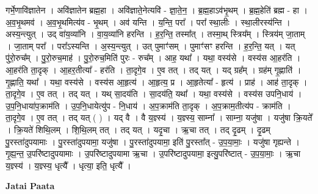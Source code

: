 \documentclass[17pt]{extarticle}
\begin{document}
गर्भे॒णावि॑ज्ञातेन । अवि॑ज्ञातेन ब्रह्म॒हा । अवि॑ज्ञाते॒नेत्यवि॑ - ज्ञा॒ते॒न॒ । ब्र॒ह्म॒हाऽव॑भृ॒थम् । ब्र॒ह्म॒हेति॑ ब्रह्म - हा । अ॒व॒भृ॒थमव॑ । अ॒व॒भृ॒थमित्य॑व - भृ॒थम् । अव॑ यन्ति । य॒न्ति॒ परा᳚ । परा᳚ स्था॒लीः । स्था॒लीरस्य॑न्ति । अस्य॒न्त्युत् । उद् वा॑य॒व्या॑नि । वा॒य॒व्या॑नि हरन्ति । ह॒र॒न्ति॒ तस्मा᳚त् । तस्मा॒थ् स्त्रिय᳚म् । स्त्रिय॑म् जा॒ताम् । जा॒ताम् परा᳚ । परा᳚ऽस्यन्ति । अ॒स्य॒न्त्युत् । उत् पुमाꣳ॑सम् । पुमाꣳ॑सꣳ हरन्ति । ह॒र॒न्ति॒ यत् । यत् पु॑रो॒रुच᳚म् । पु॒रो॒रुच॒माह॑ । पु॒रो॒रुच॒मिति॑ पुरः - रुच᳚म् । आह॒ यथा᳚ । यथा॒ वस्य॑से । वस्य॑स आ॒हर॑ति । आ॒हर॑ति ता॒दृक् । आ॒हर॒तीत्या᳚ - हर॑ति । ता॒दृगे॒व । ए॒व तत् । तद् यत् । यद् ग्रह᳚म् । ग्रह॑म् गृ॒ह्णाति॑ । गृ॒ह्णाति॒ यथा᳚ । यथा॒ वस्य॑से । वस्य॑स आ॒हृत्य॑ । आ॒हृत्य॒ प्र । आ॒हृतेत्या᳚ - हृत्य॑ । प्राह॑ । आह॑ ता॒दृक् । ता॒दृगे॒व । ए॒व तत् । तद् यत् । यथ् सा॒दय॑ति । सा॒दय॑ति॒ यथा᳚ । यथा॒ वस्य॑से । वस्य॑स उपनि॒धाय॑ । उ॒प॒नि॒धाया॑प॒क्राम॑ति । उ॒प॒नि॒धायेत्यु॑प - नि॒धाय॑ । अ॒प॒क्राम॑ति ता॒दृक् । अ॒प॒क्राम॒तीत्य॑प - क्राम॑ति । ता॒दृगे॒व । ए॒व तत् । तद् यत् ( ) । यद् वै । वै य॒ज्ञ्स्य॑ । य॒ज्ञ्स्य॒ साम्ना᳚ । साम्ना॒ यजु॑षा । यजु॑षा क्रि॒यते᳚ । क्रि॒यते॑ शिथि॒लम् । शि॒थि॒लम् तत् । तद् यत् । यदृ॒चा । ऋ॒चा तत् । तद् दृ॒ढम् । दृ॒ढम् पु॒रस्ता॑दुपयामाः । पु॒रस्ता॑दुपयामा॒ यजु॑षा । पु॒रस्ता॑दुपयामा॒ इति॑ पु॒रस्ता᳚त् - उ॒प॒या॒माः॒ । यजु॑षा गृह्यन्ते । गृ॒ह्य॒न्त॒ उ॒परि॑ष्टादुपयामाः । उ॒परि॑ष्टादुपयामा ऋ॒चा । उ॒परि॑ष्टादुपयामा॒ इत्यु॒परि॑ष्टात् - उ॒प॒या॒माः॒ । ऋ॒चा य॒ज्ञ्स्य॑ । य॒ज्ञ्स्य॒ धृत्यै᳚ । धृत्या॒ इति॒ धृत्यै᳚ । \newline

\textbf{Jatai Paata} \newline
\end{document}
